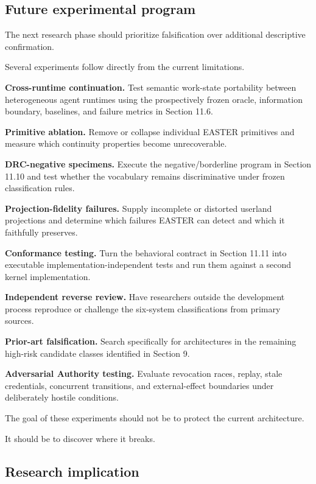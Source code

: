 \documentclass[11pt]{article}
\begin{document}
\subsection{Future experimental program}

The next research phase should prioritize falsification over additional descriptive confirmation.

Several experiments follow directly from the current limitations.

\textbf{Cross-runtime continuation.} Test semantic work-state portability between heterogeneous agent runtimes using the prospectively frozen oracle, information boundary, baselines, and failure metrics in Section 11.6.

\textbf{Primitive ablation.} Remove or collapse individual EASTER primitives and measure which continuity properties become unrecoverable.

\textbf{DRC-negative specimens.} Execute the negative/borderline program in Section 11.10 and test whether the vocabulary remains discriminative under frozen classification rules.

\textbf{Projection-fidelity failures.} Supply incomplete or distorted userland projections and determine which failures EASTER can detect and which it faithfully preserves.

\textbf{Conformance testing.} Turn the behavioral contract in Section 11.11 into executable implementation-independent tests and run them against a second kernel implementation.

\textbf{Independent reverse review.} Have researchers outside the development process reproduce or challenge the six-system classifications from primary sources.

\textbf{Prior-art falsification.} Search specifically for architectures in the remaining high-risk candidate classes identified in Section 9.

\textbf{Adversarial Authority testing.} Evaluate revocation races, replay, stale credentials, concurrent transitions, and external-effect boundaries under deliberately hostile conditions.

The goal of these experiments should not be to protect the current architecture.

It should be to discover where it breaks.

\subsection{Research implication}
\end{document}
